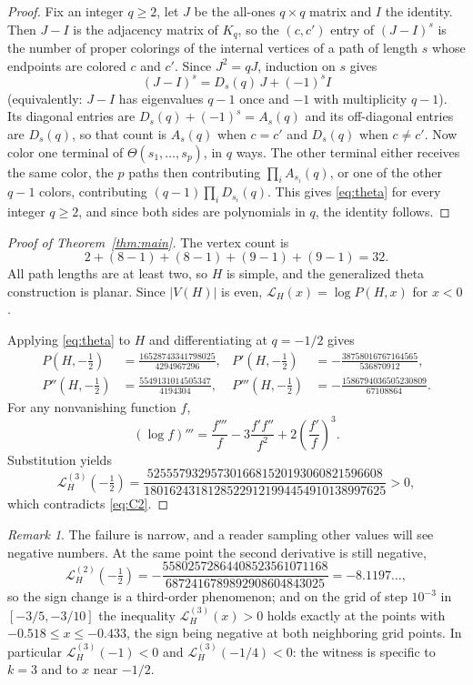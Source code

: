 \documentclass[11pt]{amsart}
\theoremstyle{remark}
\newtheorem*{remark}{Remark}
\newcommand{\Lfun}{\mathcal L}
\newcommand{\ThetaG}{\Theta}
\begin{document}
\begin{proof}
Fix an integer $q\ge2$, let $J$ be the all-ones $q\times q$ matrix and $I$ the
identity. Then $J-I$ is the adjacency matrix of $K_q$, so the $(c,c')$ entry of
$(J-I)^s$ is the number of proper colorings of the internal vertices of a path
of length $s$ whose endpoints are colored $c$ and $c'$. Since $J^2=qJ$,
induction on $s$ gives
\[
 (J-I)^s=D_s(q)\,J+(-1)^sI
\]
(equivalently: $J-I$ has eigenvalues $q-1$ once and $-1$ with multiplicity
$q-1$). Its diagonal entries are $D_s(q)+(-1)^s=A_s(q)$ and its off-diagonal
entries are $D_s(q)$, so that count is $A_s(q)$ when $c=c'$ and $D_s(q)$ when
$c\ne c'$. Now color one terminal of $\ThetaG(s_1,\ldots,s_p)$, in $q$ ways.
The other terminal either receives the same color, the $p$ paths then
contributing $\prod_iA_{s_i}(q)$, or one of the other $q-1$ colors,
contributing $(q-1)\prod_iD_{s_i}(q)$. This gives \eqref{eq:theta} for every
integer $q\ge2$, and since both sides are polynomials in $q$, the identity
follows.
\end{proof}

\begin{proof}[Proof of Theorem~\ref{thm:main}]
The vertex count is
\[
 2+(8-1)+(8-1)+(9-1)+(9-1)=32.
\]
All path lengths are at least two, so $H$ is simple, and the generalized theta
construction is planar. Since $|V(H)|$ is even,
$\Lfun_H(x)=\log P(H,x)$ for $x<0$.

Applying \eqref{eq:theta} to $H$ and differentiating at $q=-1/2$ gives
\begin{align*}
 P\left(H,-\tfrac12\right)
 &=\frac{16528743341798025}{4294967296},
 &
 P'\left(H,-\tfrac12\right)
 &=-\frac{38758016767164565}{536870912},
 \\
 P''\left(H,-\tfrac12\right)
 &=\frac{5549131014505347}{4194304},
 &
 P'''\left(H,-\tfrac12\right)
 &=-\frac{1586794036505230809}{67108864}.
\end{align*}
For any nonvanishing function $f$,
\[
 (\log f)'''
 =\frac{f'''}{f}
 -3\frac{f'f''}{f^2}
 +2\left(\frac{f'}{f}\right)^3.
\]
Substitution yields
\[
 \Lfun_H^{(3)}\!\left(-\tfrac12\right)
 =
 \frac{5255579329573016681520193060821596608}
 {18016243181285229121994454910138997625}>0,
\]
which contradicts \eqref{eq:C2}.
\end{proof}

\begin{remark}
The failure is narrow, and a reader sampling other values will see negative
numbers. At the same point the second derivative is still negative,
\[
 \Lfun_H^{(2)}\!\left(-\tfrac12\right)
 =-\frac{55802572864408523561071168}{6872416789892908604843025}
 =-8.1197\ldots,
\]
so the sign change is a third-order phenomenon; and on the grid of step
$10^{-3}$ in $[-3/5,-3/10]$ the inequality $\Lfun_H^{(3)}(x)>0$ holds exactly
at the points with $-0.518\le x\le-0.433$, the sign being negative at both
neighboring grid points. In particular $\Lfun_H^{(3)}(-1)<0$ and
$\Lfun_H^{(3)}(-1/4)<0$: the witness is specific to $k=3$ and to $x$ near
$-1/2$.
\end{remark}
\end{document}
